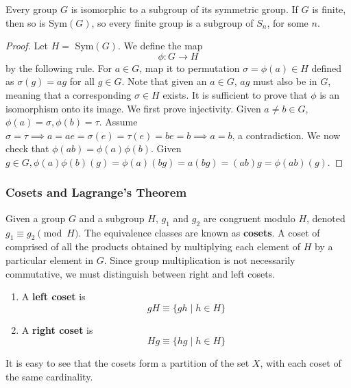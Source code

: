   \begin{theorem}
    Every group $G$ is isomorphic to a subgroup of its symmetric group. If $G$ is finite, then so is Sym$(G)$, so every finite group is a subgroup of $S_{n}$, for some $n$.
  \end{theorem}
  \begin{proof}
    Let $H =$ Sym$(G)$. We define the map
    \begin{equation}
      \phi: G \longrightarrow H
    \end{equation}
    by the following rule. For $a \in G$, map it to permutation $\sigma = \phi (a) \in H$ defined as $\sigma(g) = a g$ for all $g \in G$. Note that given an $a \in G$, $a g$ must also be in $G$, meaning that a corresponding $\sigma \in H$ exists. It is sufficient to prove that $\phi$ is an isomorphism onto its image. We first prove injectivity. Given $a \neq b \in G$, $\phi(a)=\sigma, \phi(b) = \tau$. Assume $\sigma = \tau \implies a = a e =  \sigma(e) = \tau (e) = b e = b \implies a = b$, a contradiction. We now check that $\phi(a b) = \phi(a) \phi(b)$. Given $g \in G, \phi(a) \phi(b) (g) = \phi(a) (bg) = a(bg)= (ab) g = \phi(ab) (g).$
  \end{proof}

\subsubsection{Cosets and Lagrange's Theorem}

  \begin{definition}[Coset]
    Given a group $G$ and a subgroup $H$, $g_1$ and $g_2$ are congruent modulo $H$, denoted $g_1 \equiv g_2 \pmod{H}$. The equivalence classes are known as \textbf{cosets}. A coset of comprised of all the products obtained by multiplying each element of $H$ by a particular element in $G$. Since group multiplication is not necessarily commutative, we must distinguish between right and left cosets. 
    \begin{enumerate}
      \item A \textbf{left coset} is 
        \begin{equation}
          g H \equiv \{g h \;| \;h \in H \} 
        \end{equation}
      \item A \textbf{right coset} is 
        \begin{equation}
          H g \equiv \{h g \;|\; h \in H \}
        \end{equation}
    \end{enumerate}
    It is easy to see that the cosets form a partition of the set $X$, with each coset of the same cardinality. 
  \end{definition}

